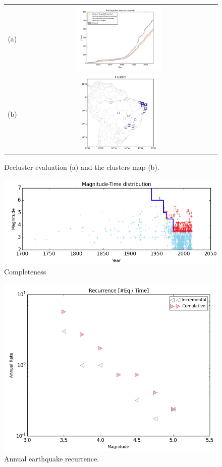 \documentclass[draft, grl]{agutex}
\begin{document}
\begin{figure}
	\begin{center}
	\begin{table}[H]
		\begin{tabular}{ c c }
		\footnotesize(a)
		& \includegraphics[width=0.45\textwidth]{z_img_hmtk_bsb2014_11_decluster}
		\\
		\footnotesize(b)
        & \includegraphics[width=0.40\textwidth]{z_img_hmtk_bsb2014_11_clusters}
		\end{tabular}
	\end{table}
	\caption{Decluster evaluation (a) and the clusters map (b).}
	\label{fig_decluster}
	\end{center}
\end{figure}


\begin{figure}
    \includegraphics[width=.45\linewidth]{z_img_hmtk_bsb2014_11_completeness}
    \caption{Completeness}
    \label{fig_completeness}
\end{figure}


\begin{figure}
    \includegraphics[width=.45\linewidth]{z_img_hmtk_bsb2014_11_recurrence}
    \caption{Annual earthquake recurrence.}
    \label{fig_occurrence}
\end{figure}
\end{document}
